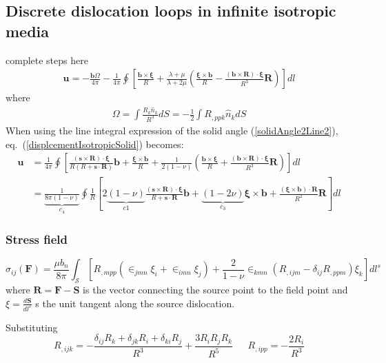 \subsection{Discrete dislocation loops in infinite isotropic media}
complete steps here
\begin{align}
\bm u=-\frac{\bm b\Omega}{4\pi}-\frac{1}{4\pi}\oint\left[\frac{\bm b\times\bm \xi}{R}+\frac{\lambda+\mu}{\lambda+2\mu}\left(\frac{\bm \xi\times\bm b}{R}-\frac{(\bm b\times\bm R)\cdot\bm \xi}{R^3}\bm R\right)\right]dl
\label{displcementIsotropicSolid}
\end{align}
where 
\begin{align}
\Omega=\int\frac{R_k\hat{n}_k}{R^3}dS=-\frac{1}{2}\int R_{,ppk}\hat{n}_kdS
\end{align}
When using the line integral expression of the solid angle (\ref{solidAngle2Line2}), eq.~(\ref{displcementIsotropicSolid}) becomes:
\begin{align}
\bm u&=\frac{1}{4\pi}\oint\left[\frac{(\bm s\times\bm R)\cdot\bm\xi}{R(R+\bm s\cdot\bm R)}\bm b+\frac{\bm \xi\times\bm b}{R}+\frac{1}{2(1-\nu)}\left(\frac{\bm b\times \bm \xi}{R}+\frac{(\bm b\times\bm R)\cdot\bm \xi}{R^3}\bm R\right)\right]dl\nonumber\\
&=\underbrace{\frac{1}{8\pi(1-\nu)}}_{c_4}\oint\frac{1}{R}\left[2\underbrace{(1-\nu)}_{c1}\frac{(\bm s\times\bm R)\cdot\bm\xi}{R+\bm s\cdot\bm R}\bm b+\underbrace{(1-2\nu)}_{c_3}\bm \xi\times\bm b+\frac{(\bm \xi\times\bm b)\cdot\bm R}{R^2}\bm R\right]dl
\label{displcementIsotropicLine}
\end{align}



\subsubsection{Stress field}
\begin{equation}
\sigma_{ij}(\bm F)=\frac{\mu b_n}{8\pi}\int_\mathcal{S} \left[R_{,mpp}\left(\in_{jmn}\xi_i+\in_{imn}\xi_j\right)+\frac{2}{1-\nu}\in_{kmn}\left(R_{,ijm}-\delta_{ij}R_{,ppm}\right)\xi_k\right]dl^s
\end{equation}
where $\bm R=\bm F-\bm S$ is the vector connecting the source point to the field point and $\xi=\frac{d\bm S}{dl^s}$ s the unit tangent along the source dislocation. 

Substituting 
\begin{equation}
R_{,ijk}=-\frac{\delta_{ij}R_k+\delta_{jk}R_i+\delta_{ki}R_j}{R^3}+\frac{3R_iR_jR_k}{R^5} \ \ \ \ \ \ \    R_{,ipp}=-\frac{2R_i}{R^3}
\end{equation}

